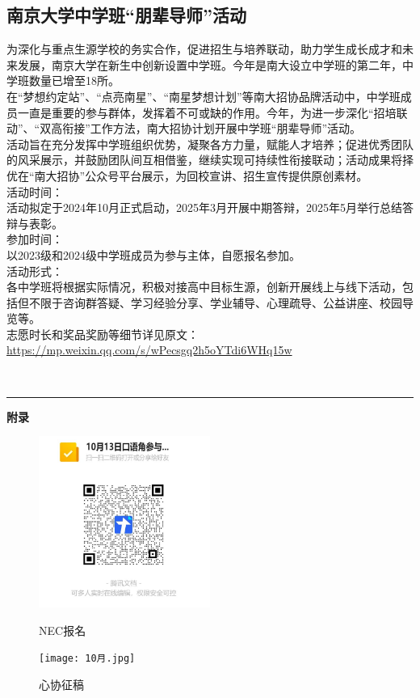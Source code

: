 \documentclass[letterpaper, 12pt]{article}
\begin{document}
\begin{multicols}{2}
\section{南京大学中学班“朋辈导师”活动}
为深化与重点生源学校的务实合作，促进招生与培养联动，助力学生成长成才和未来发展，南京大学在新生中创新设置中学班。今年是南大设立中学班的第二年，中学班数量已增至18所。\\
在“梦想约定站”、“点亮南星”、“南星梦想计划”等南大招协品牌活动中，中学班成员一直是重要的参与群体，发挥着不可或缺的作用。今年，为进一步深化“招培联动”、“双高衔接”工作方法，南大招协计划开展中学班“朋辈导师”活动。\\
活动旨在充分发挥中学班组织优势，凝聚各方力量，赋能人才培养；促进优秀团队的风采展示，并鼓励团队间互相借鉴，继续实现可持续性衔接联动；活动成果将择优在“南大招协”公众号平台展示，为回校宣讲、招生宣传提供原创素材。\\
活动时间：\\
活动拟定于2024年10月正式启动，2025年3月开展中期答辩，2025年5月举行总结答辩与表彰。\\
参加时间：\\
以2023级和2024级中学班成员为参与主体，自愿报名参加。\\
活动形式：\\
各中学班将根据实际情况，积极对接高中目标生源，创新开展线上与线下活动，包括但不限于咨询群答疑、学习经验分享、学业辅导、心理疏导、公益讲座、校园导览等。\\
志愿时长和奖品奖励等细节详见原文：\url{https://mp.weixin.qq.com/s/wPecsgq2h5oYTdi6WHq15w}


\end{multicols}
\
\hrule
\vspace{4mm}
\centerline{\huge\textbf{附录}}
\begin{figure}[htbp]
    \centering
    \begin{minipage}[b]{0.32\textwidth}
        \centering
        \includegraphics[width=0.5\textwidth]{NEC.jpg}
        \caption{NEC报名}
    \end{minipage}
    \begin{minipage}[b]{0.32\textwidth}
        \centering
        \texttt{[image: 10月.jpg]}
        \caption{心协征稿}
    \end{minipage}
\end{figure}
\end{document}
